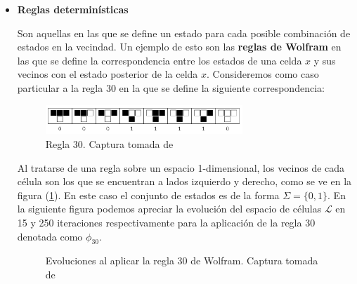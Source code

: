 \begin{itemize}
    \item \textbf{Reglas determinísticas}
    
    Son aquellas en las que se define un estado para cada posible combinación de estados en la vecindad. Un ejemplo de esto son las \textbf{reglas de Wolfram} en las que se define la correspondencia entre los estados de una celda $x$ y sus vecinos con el estado posterior de la celda $x$. Consideremos como caso particular a la regla 30 en la que se define la siguiente correspondencia:
    
    \begin{figure}[h]
      \centering
        \includegraphics[width=0.7\textwidth]{Imagenes/regla30.PNG}
      \caption{Regla 30. Captura tomada de \cite{rule30}}
      \label{fig:Regla30}
    \end{figure}
    
    Al tratarse de una regla sobre un espacio 1-dimensional, los vecinos de cada célula son los que se encuentran a lados izquierdo y derecho, como se ve en la figura (\ref{fig:Regla30}). En este caso el conjunto de estados es de la forma $\Sigma=\{0,1\}$. En la siguiente figura podemos apreciar la evolución del espacio de células $\mathcal{L}$ en 15 y 250 iteraciones respectivamente para la aplicación de la regla 30 denotada como $\phi_{30}$.
    
    \begin{figure}[htbp]\label{fig:regla30en15y250}
        \centering
        \caption{Evoluciones al aplicar la regla 30 de Wolfram. Captura tomada de \cite{rule30}}
    \end{figure}
    

\end{itemize}
